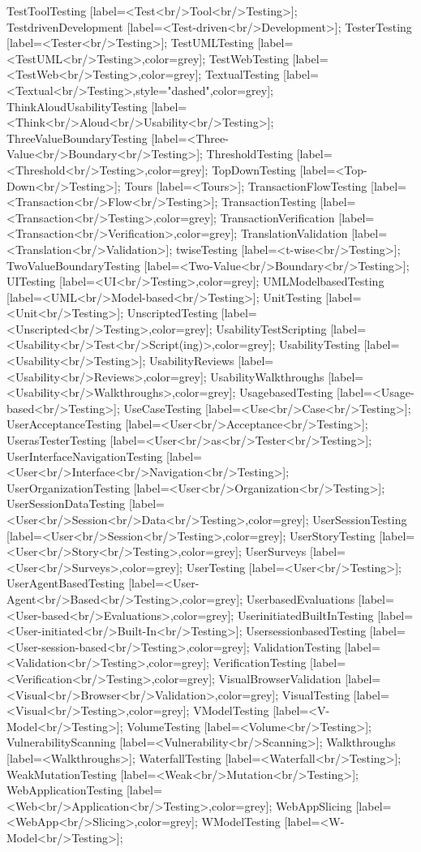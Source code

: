 \documentclass{article}
\begin{document}
{TestToolTesting [label=<Test<br/>Tool<br/>Testing>];
TestdrivenDevelopment [label=<Test-driven<br/>Development>];
TesterTesting [label=<Tester<br/>Testing>];
TestUMLTesting [label=<TestUML<br/>Testing>,color=grey];
TestWebTesting [label=<TestWeb<br/>Testing>,color=grey];
TextualTesting [label=<Textual<br/>Testing>,style="dashed",color=grey];
ThinkAloudUsabilityTesting [label=<Think<br/>Aloud<br/>Usability<br/>Testing>];
ThreeValueBoundaryTesting [label=<Three-Value<br/>Boundary<br/>Testing>];
ThresholdTesting [label=<Threshold<br/>Testing>,color=grey];
TopDownTesting [label=<Top-Down<br/>Testing>];
Tours [label=<Tours>];
TransactionFlowTesting [label=<Transaction<br/>Flow<br/>Testing>];
TransactionTesting [label=<Transaction<br/>Testing>,color=grey];
TransactionVerification [label=<Transaction<br/>Verification>,color=grey];
TranslationValidation [label=<Translation<br/>Validation>];
twiseTesting [label=<t-wise<br/>Testing>];
TwoValueBoundaryTesting [label=<Two-Value<br/>Boundary<br/>Testing>];
UITesting [label=<UI<br/>Testing>,color=grey];
UMLModelbasedTesting [label=<UML<br/>Model-based<br/>Testing>];
UnitTesting [label=<Unit<br/>Testing>];
UnscriptedTesting [label=<Unscripted<br/>Testing>,color=grey];
UsabilityTestScripting [label=<Usability<br/>Test<br/>Script(ing)>,color=grey];
UsabilityTesting [label=<Usability<br/>Testing>];
UsabilityReviews [label=<Usability<br/>Reviews>,color=grey];
UsabilityWalkthroughs [label=<Usability<br/>Walkthroughs>,color=grey];
UsagebasedTesting [label=<Usage-based<br/>Testing>];
UseCaseTesting [label=<Use<br/>Case<br/>Testing>];
UserAcceptanceTesting [label=<User<br/>Acceptance<br/>Testing>];
UserasTesterTesting [label=<User<br/>as<br/>Tester<br/>Testing>];
UserInterfaceNavigationTesting [label=<User<br/>Interface<br/>Navigation<br/>Testing>];
UserOrganizationTesting [label=<User<br/>Organization<br/>Testing>];
UserSessionDataTesting [label=<User<br/>Session<br/>Data<br/>Testing>,color=grey];
UserSessionTesting [label=<User<br/>Session<br/>Testing>,color=grey];
UserStoryTesting [label=<User<br/>Story<br/>Testing>,color=grey];
UserSurveys [label=<User<br/>Surveys>,color=grey];
UserTesting [label=<User<br/>Testing>];
UserAgentBasedTesting [label=<User-Agent<br/>Based<br/>Testing>,color=grey];
UserbasedEvaluations [label=<User-based<br/>Evaluations>,color=grey];
UserinitiatedBuiltInTesting [label=<User-initiated<br/>Built-In<br/>Testing>];
UsersessionbasedTesting [label=<User-session-based<br/>Testing>,color=grey];
ValidationTesting [label=<Validation<br/>Testing>,color=grey];
VerificationTesting [label=<Verification<br/>Testing>,color=grey];
VisualBrowserValidation [label=<Visual<br/>Browser<br/>Validation>,color=grey];
VisualTesting [label=<Visual<br/>Testing>,color=grey];
VModelTesting [label=<V-Model<br/>Testing>];
VolumeTesting [label=<Volume<br/>Testing>];
VulnerabilityScanning [label=<Vulnerability<br/>Scanning>];
Walkthroughs [label=<Walkthroughs>];
WaterfallTesting [label=<Waterfall<br/>Testing>];
WeakMutationTesting [label=<Weak<br/>Mutation<br/>Testing>];
WebApplicationTesting [label=<Web<br/>Application<br/>Testing>,color=grey];
WebAppSlicing [label=<WebApp<br/>Slicing>,color=grey];
WModelTesting [label=<W-Model<br/>Testing>];

}
\end{document}
